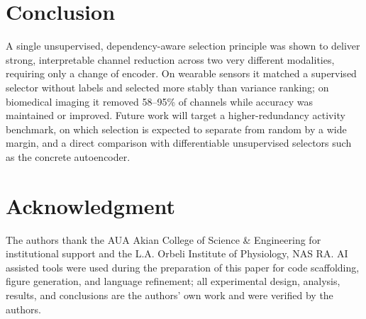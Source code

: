 \documentclass[conference]{IEEEtran}
\begin{document}
\section{Conclusion}
A single unsupervised, dependency-aware selection principle was shown to deliver
strong, interpretable channel reduction across two very different modalities,
requiring only a change of encoder. On wearable sensors it matched a supervised
selector without labels and selected more stably than variance ranking; on
biomedical imaging it removed 58--95\% of channels while accuracy was maintained
or improved. Future work will target a higher-redundancy activity benchmark, on
which selection is expected to separate from random by a wide margin, and a
direct comparison with differentiable unsupervised selectors such as the concrete
autoencoder.

\section*{Acknowledgment}
The authors thank the AUA Akian College of Science \& Engineering for
institutional support and the L.A. Orbeli Institute of Physiology, NAS RA. AI
assisted tools were used during the preparation of this paper for code
scaffolding, figure generation, and language refinement; all experimental design,
analysis, results, and conclusions are the authors' own work and were verified by
the authors.
\end{document}
